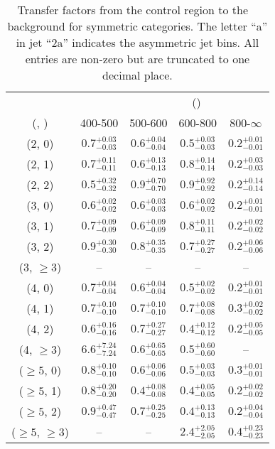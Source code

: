 \begin{table}[h!]
\tiny
\centering
\caption{Transfer factors from the \gj control region to the \zInv~ background for symmetric categories. The letter ``a'' in jet \eg ``2a''  indicates the asymmetric jet bins. All entries are non-zero but are truncated to one decimal place.\label{tab:tf_gj_zinv_sym}}
\begin{tabular}
{ccccc}
	\hline\hline
&	& \multicolumn{4}{c}{\scalht (\gev)} \\ 
	 (\njet,  \nb) & 400-500 & 500-600 & 600-800 & 800-$\infty$ \\ [0.8ex] 
\hline
	(2, 0) & $0.7^{+ 0.03 }_{- 0.03 }$ & $0.6^{+ 0.04 }_{- 0.04 }$ & $0.5^{+ 0.03 }_{- 0.03 }$ & $0.2^{+ 0.01 }_{- 0.01 }$ \\[0.5ex] 
	(2, 1) & $0.7^{+ 0.11 }_{- 0.11 }$ & $0.6^{+ 0.13 }_{- 0.13 }$ & $0.8^{+ 0.14 }_{- 0.14 }$ & $0.2^{+ 0.03 }_{- 0.03 }$ \\[0.5ex] 
	(2, 2) & $0.5^{+ 0.32 }_{- 0.32 }$ & $0.9^{+ 0.70 }_{- 0.70 }$ & $0.9^{+ 0.92 }_{- 0.92 }$ & $0.2^{+ 0.14 }_{- 0.14 }$ \\[0.5ex] 
	(3, 0) & $0.6^{+ 0.02 }_{- 0.02 }$ & $0.6^{+ 0.03 }_{- 0.03 }$ & $0.6^{+ 0.02 }_{- 0.02 }$ & $0.2^{+ 0.01 }_{- 0.01 }$ \\[0.5ex] 
	(3, 1) & $0.7^{+ 0.09 }_{- 0.09 }$ & $0.6^{+ 0.09 }_{- 0.09 }$ & $0.8^{+ 0.11 }_{- 0.11 }$ & $0.2^{+ 0.02 }_{- 0.02 }$ \\[0.5ex] 
	(3, 2) & $0.9^{+ 0.30 }_{- 0.30 }$ & $0.8^{+ 0.35 }_{- 0.35 }$ & $0.7^{+ 0.27 }_{- 0.27 }$ & $0.2^{+ 0.06 }_{- 0.06 }$ \\[0.5ex] 
	(3, $\ge3$) & -- & -- & -- & -- \\[0.5ex] 
	(4, 0) & $0.7^{+ 0.04 }_{- 0.04 }$ & $0.6^{+ 0.04 }_{- 0.04 }$ & $0.5^{+ 0.02 }_{- 0.02 }$ & $0.2^{+ 0.01 }_{- 0.01 }$ \\[0.5ex] 
	(4, 1) & $0.7^{+ 0.10 }_{- 0.10 }$ & $0.7^{+ 0.10 }_{- 0.10 }$ & $0.7^{+ 0.08 }_{- 0.08 }$ & $0.3^{+ 0.02 }_{- 0.02 }$ \\[0.5ex] 
	(4, 2) & $0.6^{+ 0.16 }_{- 0.16 }$ & $0.7^{+ 0.27 }_{- 0.27 }$ & $0.4^{+ 0.12 }_{- 0.12 }$ & $0.2^{+ 0.05 }_{- 0.05 }$ \\[0.5ex] 
	(4, $\ge3$) & $6.6^{+ 7.24 }_{- 7.24 }$ & $0.6^{+ 0.65 }_{- 0.65 }$ & $0.5^{+ 0.60 }_{- 0.60 }$ & -- \\[0.5ex] 
	($\ge5$, 0) & $0.8^{+ 0.10 }_{- 0.10 }$ & $0.6^{+ 0.06 }_{- 0.06 }$ & $0.5^{+ 0.03 }_{- 0.03 }$ & $0.3^{+ 0.01 }_{- 0.01 }$ \\[0.5ex] 
	($\ge5$, 1) & $0.8^{+ 0.20 }_{- 0.20 }$ & $0.4^{+ 0.08 }_{- 0.08 }$ & $0.4^{+ 0.05 }_{- 0.05 }$ & $0.2^{+ 0.02 }_{- 0.02 }$ \\[0.5ex] 
	($\ge5$, 2) & $0.9^{+ 0.47 }_{- 0.47 }$ & $0.7^{+ 0.25 }_{- 0.25 }$ & $0.4^{+ 0.13 }_{- 0.13 }$ & $0.2^{+ 0.04 }_{- 0.04 }$ \\[0.5ex] 
	($\ge5$, $\ge3$) & -- & -- & $2.4^{+ 2.05 }_{- 2.05 }$ & $0.4^{+ 0.23 }_{- 0.23 }$ \\[0.5ex] 
	\hline
	\hline
\end{tabular}
\end{table}
